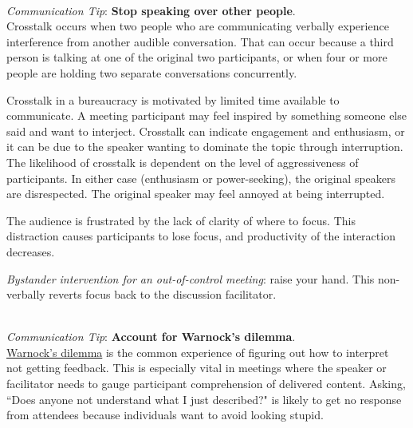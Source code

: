 \ \\
\textit{Communication Tip}: \textbf{Stop speaking over other people\label{sec:crosstalk}}.\\
Crosstalk occurs when two people who are communicating verbally experience interference from another audible conversation. That can occur because a third person is talking at one of the original two participants, or when four or more people are holding two separate conversations concurrently. 

Crosstalk in a bureaucracy is motivated by
limited time available to communicate. A meeting participant may feel inspired by something someone else said and want to interject. 
Crosstalk can indicate engagement and enthusiasm, or it can be due to the speaker wanting to dominate the topic through interruption. The likelihood of crosstalk is dependent on the level of aggressiveness of participants.
In either case (enthusiasm or power-seeking), the original speakers are disrespected. The original speaker may feel annoyed at being interrupted.



The audience is frustrated by the lack of clarity of where to focus. This distraction causes participants to lose  focus, and productivity of the interaction decreases.

\textit{Bystander intervention for an out-of-control meeting}: raise your hand. 
This non-verbally reverts focus back to the discussion facilitator. 

\ \\
\textit{Communication Tip}: \textbf{Account for Warnock's dilemma}.\\
\href{https://en.wikipedia.org/wiki/Warnock\%27s_dilemma}{Warnock's dilemma}
is the common experience of figuring out how to interpret not getting feedback. This is especially vital in meetings where the speaker or facilitator needs to gauge participant comprehension of delivered content. Asking, ``Does anyone not understand what I just described?" is likely to get no response from attendees because individuals want to avoid looking stupid.

